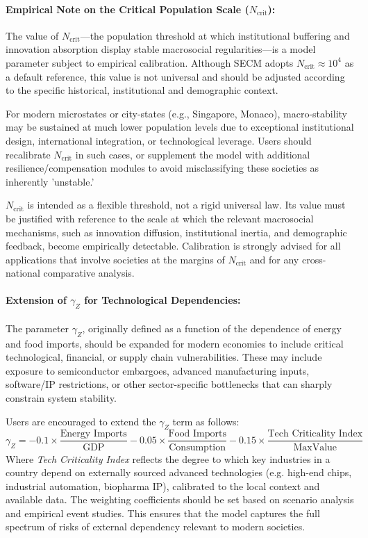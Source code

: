 \documentclass[12pt]{report}
\begin{document}
\paragraph{Empirical Note on the Critical Population Scale ($N_{\text{crit}}$):}
The value of $N_{\text{crit}}$—the population threshold at which institutional buffering and innovation absorption display stable macrosocial regularities—is a model parameter subject to empirical calibration. Although SECM adopts $N_{\text{crit}} \approx 10^4$ as a default reference, this value is not universal and should be adjusted according to the specific historical, institutional and demographic context.

For modern microstates or city-states (e.g., Singapore, Monaco), macro-stability may be sustained at much lower population levels due to exceptional institutional design, international integration, or technological leverage. Users should recalibrate $N_{\text{crit}}$ in such cases, or supplement the model with additional resilience/compensation modules to avoid misclassifying these societies as inherently 'unstable.'

$N_{\text{crit}}$ is intended as a flexible threshold, not a rigid universal law. Its value must be justified with reference to the scale at which the relevant macrosocial mechanisms, such as innovation diffusion, institutional inertia, and demographic feedback, become empirically detectable. Calibration is strongly advised for all applications that involve societies at the margins of $N_{\text{crit}}$ and for any cross-national comparative analysis.

\paragraph{Extension of $\gamma_Z$ for Technological Dependencies:}
The parameter $\gamma_Z$, originally defined as a function of the dependence of energy and food imports, should be expanded for modern economies to include critical technological, financial, or supply chain vulnerabilities. These may include exposure to semiconductor embargoes, advanced manufacturing inputs, software/IP restrictions, or other sector-specific bottlenecks that can sharply constrain system stability.

Users are encouraged to extend the $\gamma_Z$ term as follows:
\[
\gamma_Z = -0.1 \times \frac{\text{Energy Imports}}{\text{GDP}} 
           -0.05 \times \frac{\text{Food Imports}}{\text{Consumption}} 
           -0.15 \times \frac{\text{Tech Criticality Index}}{\text{MaxValue}}
\]
Where \textit{Tech Criticality Index} reflects the degree to which key industries in a country depend on externally sourced advanced technologies (e.g. high-end chips, industrial automation, biopharma IP), calibrated to the local context and available data. The weighting coefficients should be set based on scenario analysis and empirical event studies.
This ensures that the model captures the full spectrum of risks of external dependency relevant to modern societies.
\end{document}
